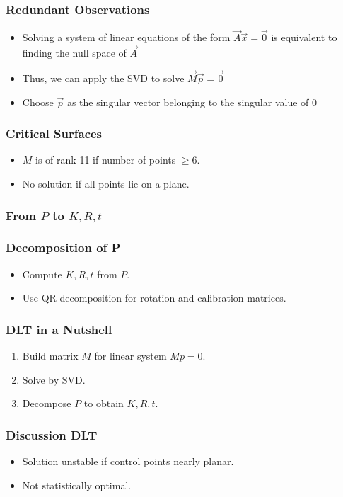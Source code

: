 \begin{frame}
  \frametitle{Redundant Observations}
  \begin{itemize}
    \item Solving a system of linear equations of the form $\vec{A}\vec{x} = \vec{0}$ is equivalent to finding the null space of $\vec{A}$
    \item Thus, we can apply the SVD to solve $\vec{M}\vec{p} = \vec{0}$
    \item Choose $\vec{p}$ as the singular vector belonging to the singular value of 0
  \end{itemize}
\end{frame}

\begin{frame}
  \frametitle{Critical Surfaces}
  \begin{itemize}
    \item $M$ is of rank 11 if number of points $\ge 6$.
    \item No solution if all points lie on a plane.
  \end{itemize}
\end{frame}

\begin{frame}
  \frametitle{From $P$ to $K,R,t$}
\end{frame}

\begin{frame}
  \frametitle{Decomposition of P}
  \begin{itemize}
    \item Compute $K, R, t$ from $P$.
    \item Use QR decomposition for rotation and calibration matrices.
  \end{itemize}
\end{frame}

\begin{frame}
  \frametitle{DLT in a Nutshell}
  \begin{enumerate}
    \item Build matrix $M$ for linear system $M p = 0$.
    \item Solve by SVD.
    \item Decompose $P$ to obtain $K,R,t$.
  \end{enumerate}
\end{frame}

\begin{frame}
  \frametitle{Discussion DLT}
  \begin{itemize}
    \item Solution unstable if control points nearly planar.
    \item Not statistically optimal.
  \end{itemize}
\end{frame}


